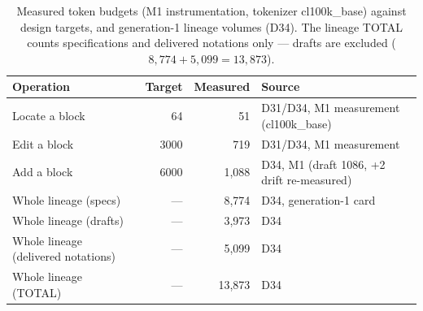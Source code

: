 \begin{table}[htbp]\centering\footnotesize
\caption{Measured token budgets (M1 instrumentation, tokenizer cl100k\_base) against design targets, and generation-1 lineage volumes (D34). The lineage TOTAL counts specifications and delivered notations only --- drafts are excluded ($8{,}774 + 5{,}099 = 13{,}873$).}
\label{tab:budgets}
\begin{tabular}{@{}lrrl@{}}
\toprule
\textbf{Operation} & \textbf{Target} & \textbf{Measured} & \textbf{Source} \\
\midrule
Locate a block & 64 & 51 & D31/D34, M1 measurement (cl100k\_base) \\
Edit a block & 3000 & 719 & D31/D34, M1 measurement \\
Add a block & 6000 & 1,088 & D34, M1 (draft 1086, +2 drift re-measured) \\
Whole lineage (specs) & --- & 8,774 & D34, generation-1 card \\
Whole lineage (drafts) & --- & 3,973 & D34 \\
Whole lineage (delivered notations) & --- & 5,099 & D34 \\
Whole lineage (TOTAL) & --- & 13,873 & D34 \\
\bottomrule
\end{tabular}\end{table}

